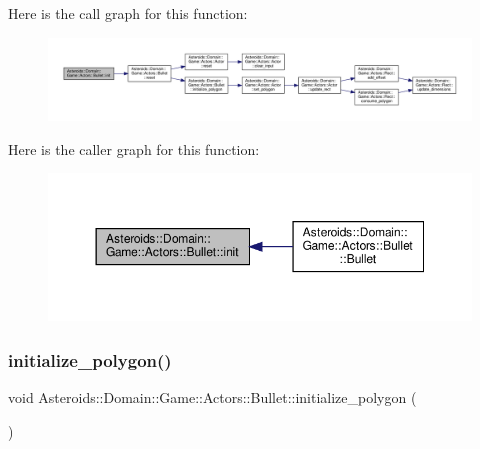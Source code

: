 Here is the call graph for this function\+:\nopagebreak
\begin{figure}[H]
\begin{center}
\leavevmode
\includegraphics[width=350pt]{classAsteroids_1_1Domain_1_1Game_1_1Actors_1_1Bullet_a1c7b384d298439c581d97f996f067985_cgraph}
\end{center}
\end{figure}
Here is the caller graph for this function\+:\nopagebreak
\begin{figure}[H]
\begin{center}
\leavevmode
\includegraphics[width=350pt]{classAsteroids_1_1Domain_1_1Game_1_1Actors_1_1Bullet_a1c7b384d298439c581d97f996f067985_icgraph}
\end{center}
\end{figure}
\mbox{\label{classAsteroids_1_1Domain_1_1Game_1_1Actors_1_1Bullet_ae02bb0b6f3886f31ffdf1e51b1735035}} 
\subsubsection{\texorpdfstring{initialize\+\_\+polygon()}{initialize\_polygon()}}
{\footnotesize\ttfamily void Asteroids\+::\+Domain\+::\+Game\+::\+Actors\+::\+Bullet\+::initialize\+\_\+polygon (\begin{DoxyParamCaption}{ }\end{DoxyParamCaption})\hspace{0.3cm}{\ttfamily [private]}}



